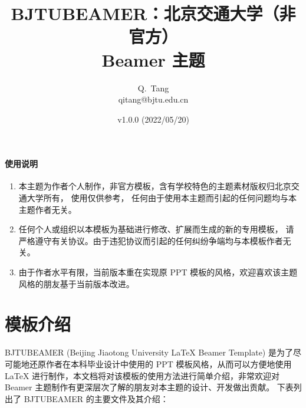 \documentclass[a4paper,zihao=-4,notitlepage,oneside,openright]{ctexart}
\title{\textbf{\heiti\color{bjtudarkblue}B{\zihao{-4}JTU}B{\zihao{-4}EAMER}：北京交通大学（非官方）\\Beamer 主题}}
\author{Q.~Tang\\{\zihao{-4}qitang@bjtu.edu.cn}}
\date{\zihao{-4}v1.0.0 (2022/05/20)}
\begin{document}
\maketitle


\paragraph{使用说明}
\begin{enumerate}
	\item 本主题为作者个人制作，非官方模板，含有学校特色的主题素材版权归北京交通大学所有， 使用仅供参考， 任何由于使用本主题而引起的任何问题均与本主题作者无关。
	\item 任何个人或组织以本模板为基础进行修改、扩展而生成的新的专用模板， 请严格遵守有关协议。由于违犯协议而引起的任何纠纷争端均与本模板作者无关。
	\item 由于作者水平有限，当前版本重在实现原 PPT 模板的风格，欢迎喜欢该主题风格的朋友基于当前版本改进。
\end{enumerate}

\tableofcontents

\setcounter{page}{0}
\thispagestyle{empty}
\newpage

\section{模板介绍}


BJTUBEAMER (Beijing Jiaotong University \LaTeX{} Beamer Template) 是为了尽可能地还原作者在本科毕业设计中使用的 PPT 模板风格，从而可以方便地使用 \LaTeX{} 进行制作，本文档将对该模板的使用方法进行简单介绍，非常欢迎对 Beamer 主题制作有更深层次了解的朋友对本主题的设计、开发做出贡献。
下表列出了 BJTUBEAMER 的主要文件及其介绍：
\end{document}
